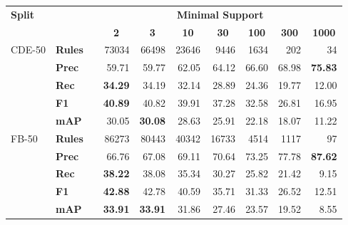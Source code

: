 \begin{tabular}{ l l c r r r r r r r }
    \toprule

    \multicolumn{1}{l}{\textbf{Split}} &
    & \phantom &
    \multicolumn{7}{c}{\textbf{Minimal Support}} \\

    \cmidrule{4-10}

    &
    &&
    \multicolumn{1}{c}{\textbf{2}} &
    \multicolumn{1}{c}{\textbf{3}} &
    \multicolumn{1}{c}{\textbf{10}} &
    \multicolumn{1}{c}{\textbf{30}} &
    \multicolumn{1}{c}{\textbf{100}} &
    \multicolumn{1}{c}{\textbf{300}} &
    \multicolumn{1}{c}{\textbf{1000}} \\

    \midrule

    \multirow{5}{*}{CDE-50}
    & \textbf{Rules} && \num{73034} & \num{66498} & \num{23646}  & \num{9446}  & \num{1634} & \num{202} & \num{34}   \\

    \addlinespace

    & \textbf{Prec}  && 59.71       & 59.77       & 62.05       & 64.12       & 66.60      & 68.98      & \textbf{75.83}      \\
    & \textbf{Rec}   && \textbf{34.29}       & 34.19       & 32.14       & 28.89       & 24.36      & 19.77      & 12.00      \\
    & \textbf{F1}    && \textbf{40.89}       & 40.82       & 39.91       & 37.28       & 32.58      & 26.81      & 16.95      \\
    & \textbf{mAP}   && 30.05       & \textbf{30.08}       & 28.63       & 25.91       & 22.18      & 18.07      & 11.22      \\

    \midrule

    \multirow{5}{*}{FB-50}
    & \textbf{Rules} && \num{86273} & \num{80443} & \num{40342} & \num{16733} & \num{4514} & \num{1117} & \num{97}   \\

    \addlinespace

    & \textbf{Prec}  && 66.76       & 67.08       & 69.11       & 70.64       & 73.25      & 77.78      & \textbf{87.62}      \\
    & \textbf{Rec}   && \textbf{38.22}       & 38.08       & 35.34       & 30.27       & 25.82      & 21.42      & 9.15       \\
    & \textbf{F1}    && \textbf{42.88}       & 42.78       & 40.59       & 35.71       & 31.33      & 26.52      & 12.51      \\
    & \textbf{mAP}   && \textbf{33.91}       & \textbf{33.91}       & 31.86       & 27.46       & 23.57      & 19.52      & 8.55       \\

    \bottomrule
\end{tabular}
